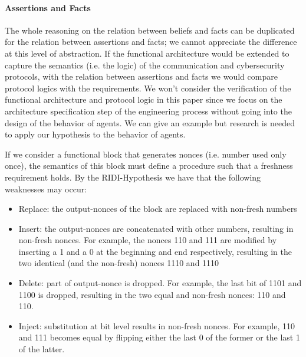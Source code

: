 \documentclass[conference]{IEEEtran}
\begin{document}
\paragraph{Assertions and Facts}
The whole reasoning on the relation between beliefs and facts can be duplicated
for the relation between assertions and facts; we cannot appreciate the
difference at this level of abstraction.  If the functional architecture would
be extended to capture the semantics (i.e. the logic) of the communication and
cybersecurity protocols, with the relation between assertions and facts we would
compare protocol logics with the requirements. We won't consider the verification of
the functional architecture and protocol logic in this paper since we
focus on the architecture specification step of the engineering process
without going into the design of the behavior of agents. We can give an example
but research is needed to apply our hypothesis
to the behavior of agents. 

If we consider a functional block that generates nonces (i.e. number used
only once), the semantics of this block must define a procedure such that 
a freshness requirement holds. By the RIDI-Hypothesis we have that
the following weaknesses may occur:
\begin{itemize}
	\item Replace: the output-nonces of the block are replaced with
		non-fresh numbers
	\item Insert: the output-nonces are concatenated with other numbers,
		resulting in non-fresh nonces. For example, the nonces 110 and
		111 are modified by inserting a 1 and a 0 at the beginning and
		end respectively, resulting in the two identical (and the
		non-fresh) nonces 1110 and 1110
	\item Delete: part of output-nonce is dropped. For example, the last bit of 1101 and 1100 is dropped, resulting in the two equal and non-fresh nonces: 110 and 110.
	\item Inject: substitution at bit level results in non-fresh nonces. For example, 110 and 111 becomes equal by flipping either the last 0 of the former or the last 1 of the latter.
\end{itemize}
\end{document}
